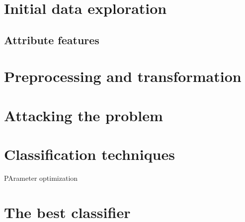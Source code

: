 
\section{Initial data exploration}
\subsection{Attribute features}


\section{Preprocessing and transformation}

\section{Attacking the problem}

\section{Classification techniques}


 PArameter optimization

\section{The best classifier}




